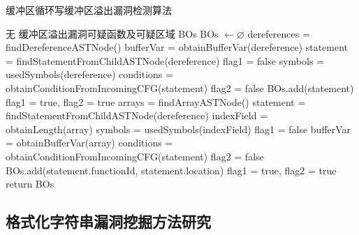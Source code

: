 {\begin{breakablealgorithm}
	\label{缓冲区循环写缓冲区溢出漏洞检测算法}
	\caption{缓冲区循环写缓冲区溢出漏洞检测算法}
	\begin{algorithmic}[1]
	\REQUIRE 无
	\ENSURE 缓冲区溢出漏洞可疑函数及可疑区域 BOs
	\STATE BOs $\leftarrow \varnothing$
	\STATE dereferences = findDereferenceASTNode()
		\STATE bufferVar = obtainBufferVar(dereference)
		\STATE statement = findStatementFromChildASTNode(dereference)
				\STATE flag1 = false
			\ENDIF
			\STATE symbols = usedSymbols(dereference)
			\STATE conditions = obtainConditionFromIncomingCFG(statement)
					\STATE flag2 = false
				\ENDIF
			\ENDFOR
				\STATE BOs.add(statement)
			\ENDIF
			\STATE flag1 = true, flag2 = true
		\ENDIF
	\ENDFOR
	\STATE arrays = findArrayASTNode()
		\STATE statement = findStatementFromChildASTNode(dereference)
			\STATE indexField = obtainLength(array)
			\STATE symbols = usedSymbols(indexField)
					\STATE flag1 = false
				\ENDIF
			\ENDFOR
			\STATE bufferVar = obtainBufferVar(array)
			\STATE conditions = obtainConditionFromIncomingCFG(statement)
					\STATE flag2 = false
				\ENDIF
			\ENDFOR
				\STATE BOs.add(statement.functionId, statement.location)
			\ENDIF
			\STATE flag1 = true, flag2 = true
		\ENDIF
	\ENDFOR
	\STATE return BOs	
	\end{algorithmic}
\end{breakablealgorithm}

\subsection{格式化字符串漏洞挖掘方法研究}

}
